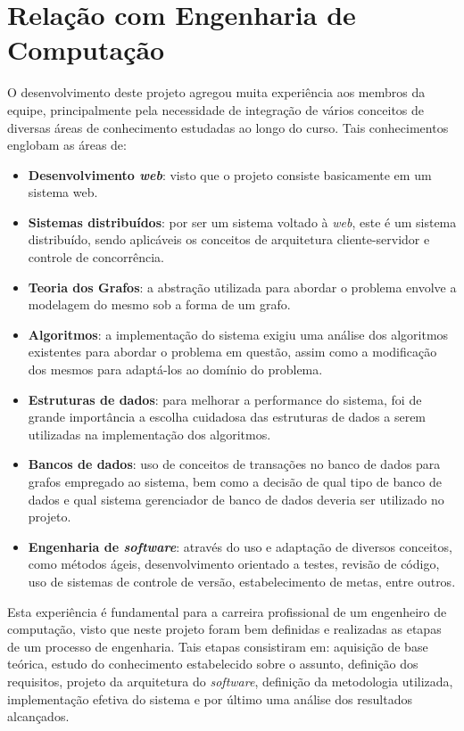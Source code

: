 \section{Relação com Engenharia de Computação}
O desenvolvimento deste projeto agregou muita experiência aos membros da equipe, principalmente pela necessidade de integração de vários conceitos de diversas áreas de conhecimento estudadas ao longo do curso.
Tais conhecimentos englobam as áreas de:
\begin{itemize}
	\item \textbf{Desenvolvimento \emph{web}}: visto que o projeto consiste basicamente em um sistema web.
	\item \textbf{Sistemas distribuídos}: por ser um sistema voltado à \emph{web}, este é um sistema distribuído, sendo aplicáveis os conceitos de arquitetura cliente-servidor e controle de concorrência.
	\item \textbf{Teoria dos Grafos}: a abstração utilizada para abordar o problema envolve a modelagem do mesmo sob a forma de um grafo.
	\item \textbf{Algoritmos}: a implementação do sistema exigiu uma análise dos algoritmos existentes para abordar o problema em questão, assim como a modificação dos mesmos para adaptá-los ao domínio do problema.
	\item \textbf{Estruturas de dados}: para melhorar a performance do sistema, foi de grande importância a escolha cuidadosa das estruturas de dados a serem utilizadas na implementação dos algoritmos.
	\item \textbf{Bancos de dados}: uso de conceitos de transações no banco de dados para grafos empregado ao sistema, bem como a decisão de qual tipo de banco de dados e qual sistema gerenciador de banco de dados deveria ser utilizado no projeto.
	\item \textbf{Engenharia de \emph{software}}: através do uso e adaptação de diversos conceitos, como métodos ágeis, desenvolvimento orientado a testes, revisão de código, uso de sistemas de controle de versão, estabelecimento de metas, entre outros.
\end{itemize}

Esta experiência é fundamental para a carreira profissional de um engenheiro de computação, visto que neste projeto foram bem definidas e realizadas as etapas de um processo de engenharia. 
Tais etapas consistiram em: aquisição de base teórica, estudo do conhecimento estabelecido sobre o assunto, definição dos requisitos, projeto da arquitetura do \emph{software}, definição da metodologia utilizada, implementação efetiva do sistema e por último uma análise dos resultados alcançados. 

